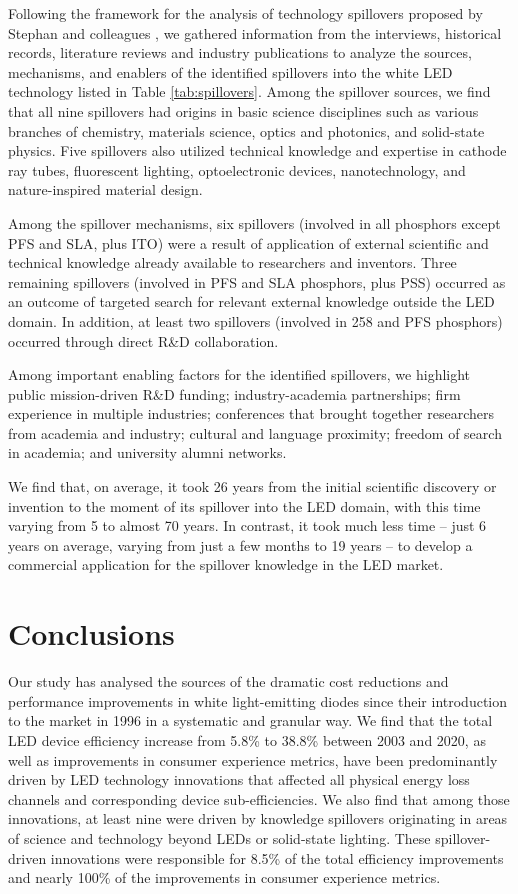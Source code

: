 \documentclass[parskip=full]{article}
\begin{document}
Following the framework for the analysis of technology spillovers proposed by Stephan and colleagues \cite{Stephan2021}, we gathered information from the interviews, historical records, literature reviews and industry publications to analyze the sources, mechanisms, and enablers of the identified spillovers into the white LED technology listed in Table \ref{tab:spillovers}. Among the spillover sources, we find that all nine spillovers had origins in basic science disciplines such as various branches of chemistry, materials science, optics and photonics, and solid-state physics. Five spillovers also utilized technical knowledge and expertise in cathode ray tubes, fluorescent lighting, optoelectronic devices, nanotechnology, and nature-inspired material design. 

Among the spillover mechanisms, six spillovers (involved in all phosphors except PFS and SLA, plus ITO) were a result of application of external scientific and technical knowledge already available to researchers and inventors. Three remaining spillovers (involved in PFS and SLA phosphors, plus PSS) occurred as an outcome of targeted search for relevant external knowledge outside the LED domain. In addition, at least two spillovers (involved in 258 and PFS phosphors) occurred through direct R\&D collaboration.

Among important enabling factors for the identified spillovers, we highlight public mission-driven R\&D funding; industry-academia partnerships; firm experience in multiple industries; conferences that brought together researchers from academia and industry; cultural and language proximity; freedom of search in academia; and university alumni networks.

We find that, on average, it took 26 years from the initial scientific discovery or invention to the moment of its spillover into the LED domain, with this time varying from 5 to almost 70 years. In contrast, it took much less time – just 6 years on average, varying from just a few months to 19 years – to develop a commercial application for the spillover knowledge in the LED market. 

\section{Conclusions}

Our study has analysed the sources of the dramatic cost reductions and performance improvements in white light-emitting diodes since their introduction to the market in 1996 in a systematic and granular way. We find that the total LED device efficiency increase from 5.8\% to 38.8\% between 2003 and 2020, as well as improvements in consumer experience metrics, have been predominantly driven by LED technology innovations that affected all physical energy loss channels and corresponding device sub-efficiencies. We also find that among those innovations, at least nine were driven by knowledge spillovers originating in areas of science and technology beyond LEDs or solid-state lighting. These spillover-driven innovations were responsible for 8.5\% of the total efficiency improvements and nearly 100\% of the improvements in consumer experience metrics. 
\end{document}
